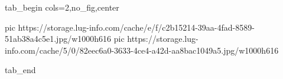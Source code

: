  
 
 
 
 


\ifcmt
  tab_begin cols=2,no_fig,center

     pic https://storage.lug-info.com/cache/e/f/c2b15214-39aa-4fad-8589-51ab38a4c5e1.jpg/w1000h616%
     pic https://storage.lug-info.com/cache/5/0/82eec6a0-3633-4ce4-a42d-aa8bac1049a5.jpg/w1000h616%

  tab_end
\fi
